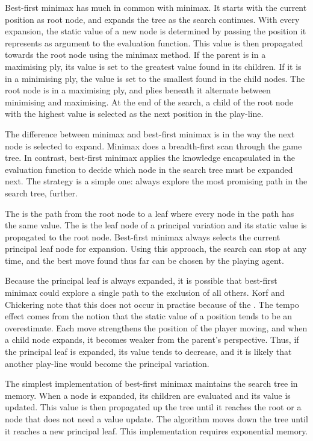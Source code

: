 Best-first minimax has much in common with minimax. It starts with the current position as root node, and expands the tree as the search continues.  With every expansion, the static value of a new node is determined by passing the position it represents as argument to the evaluation function.  This value is then propagated towards the root node using the minimax method. If the parent is in a maximising ply, its value is set to the greatest value found in its children.  If it is in a minimising ply, the value is set to the smallest found in the child nodes.  The root node is in a maximising ply, and plies beneath it alternate between minimising and maximising. At the end of the search, a child of the root node with the highest value is selected as the next position in the play-line.  

The difference between minimax and best-first minimax is in the way the next node is selected to expand.  Minimax does a breadth-first scan through the game tree.  In contrast, best-first minimax  applies the  knowledge encapsulated in the evaluation function to decide which node in the search tree must be expanded next. The strategy is a simple one: always explore the most promising path in the search tree, further.  

The  is the path from the root node to a leaf where every node in the path has the same value.  The  is the leaf node of a principal variation and its static value is propagated to the root node.  Best-first minimax always selects the current principal leaf node for expansion.  Using this approach, the search can stop at any time, and the best move found thus far can be chosen by the playing agent.

Because the principal leaf is always expanded, it is possible that best-first minimax could explore a single path to the exclusion of all others.  Korf and Chickering note that this does not occur in practise because of the . The tempo effect comes from the notion that the static value of a position tends to be an overestimate.  Each move strengthens  the position of the player moving, and when a child node expands, it becomes weaker from the parent's perspective.  Thus, if the principal leaf is expanded, its value tends to decrease, and it is likely that another play-line would become the principal variation.

The simplest implementation of best-first minimax maintains the search tree in memory.  When a node is expanded, its children are evaluated and its value is updated.  This value is then propagated up the tree  until it reaches the root or a node  that does not need a value update.  The algorithm moves down the tree until it reaches a new principal leaf.  This implementation requires exponential memory.  

